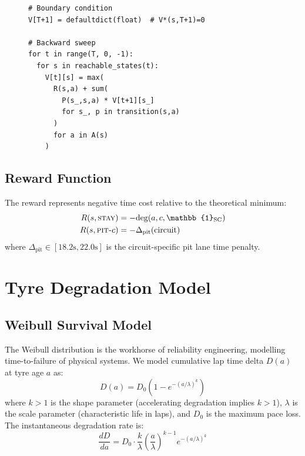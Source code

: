 \documentclass[11pt, a4paper, twocolumn]{article}
\numberwithin{equation}{section}
\theoremstyle{definition}
\newcommand{\compound}{c}
\newcommand{\age}{a}
\newcommand{\pitdelta}{\Delta_{\text{pit}}}
\begin{document}
\begin{figure}[!h]
\begin{lstlisting}[caption={Backward induction core loop (solver.py)},
                   label={alg:bi}]
# Boundary condition
V[T+1] = defaultdict(float)  # V*(s,T+1)=0

# Backward sweep
for t in range(T, 0, -1):
  for s in reachable_states(t):
    V[t][s] = max(
      R(s,a) + sum(
        P(s_,s,a) * V[t+1][s_]
        for s_, p in transition(s,a)
      )
      for a in A(s)
    )
\end{lstlisting}
\end{figure}

\subsection{Reward Function}

The reward represents negative time cost relative to the theoretical minimum:
\begin{align}
  R(s, \textsc{stay}) &= -\text{deg}(\age, \compound, \mathbb{1}_{\text{SC}}) \\
  R(s, \textsc{pit-}c) &= -\pitdelta(\text{circuit})
\end{align}
where $\pitdelta \in [18.2\text{s}, 22.0\text{s}]$ is the circuit-specific
pit lane time penalty.

\section{Tyre Degradation Model}

\subsection{Weibull Survival Model}

The Weibull distribution is the workhorse of reliability engineering,
modelling time-to-failure of physical systems. We model cumulative lap time
delta $D(\age)$ at tyre age $\age$ as:
\begin{equation}
  D(\age) = D_0 \left(1 - e^{-(\age/\lambda)^k}\right)
  \label{eq:weibull}
\end{equation}
where $k > 1$ is the shape parameter (accelerating degradation implies $k > 1$),
$\lambda$ is the scale parameter (characteristic life in laps), and $D_0$
is the maximum pace loss. The instantaneous degradation rate is:
\begin{equation}
  \frac{dD}{d\age} = D_0 \cdot \frac{k}{\lambda}
  \left(\frac{\age}{\lambda}\right)^{k-1}
  e^{-(\age/\lambda)^k}
\end{equation}
\end{document}
